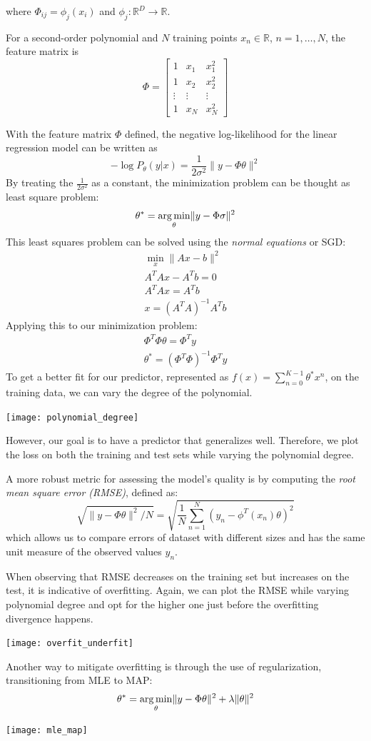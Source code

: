 \documentclass{article}
\begin{document}
where $\Phi_{ij}=\phi_j(x_i)$ and $\phi_j:\mathbb{R}^D\to \mathbb{R}$.
\begin{example}
    For a second-order polynomial and $N$ training points $x_n\in \mathbb{R}$,
    $n=1,\ldots,N$, the feature matrix is
    $$
    \Phi=\begin{bmatrix}
        1 & x_1 & x_1^2 \\ 
        1 & x_2 & x_2^2 \\ 
        \vdots & \vdots & \vdots \\ 
        1 & x_N & x_N^2
    \end{bmatrix}
    $$
\end{example}
With the feature matrix $\Phi$ defined, the negative log-likelihood for the
linear regression model can be written as 
$$-\log P_\theta(y|x)=\frac{1}{2\sigma^2}\lVert y-\Phi\theta\rVert^2$$
By treating the $\frac{1}{2\sigma^2}$ as a constant, the minimization problem
can be thought as least square problem:
$$\theta^*=\operatorname*{arg\,min}_{\theta}\lVert y-\Phi\sigma\rVert^2$$
This least squares problem can be solved using the \textit{normal equations} or SGD:
$$
\begin{aligned}
    \min_x\lVert Ax-b\rVert^2 \\
    A^TAx-A^Tb=0 \\
    A^TAx=A^Tb \\ 
    x=(A^TA)^{-1}A^Tb
\end{aligned}
$$
Applying this to our minimization problem:
$$
\begin{aligned}
    \Phi^T\Phi\theta=\Phi^Ty\\
    \theta^*=(\Phi^T\Phi)^{-1}\Phi^Ty
\end{aligned}
$$
To get a better fit for our predictor, represented as
$f(x)=\sum_{n=0}^{K-1}\theta^*x^n$, on the training data, we can vary the
degree of the polynomial. 
\begin{center}
    \texttt{[image: polynomial\_degree]}
\end{center}
However, our goal is to have a predictor that generalizes well. Therefore, we
plot the loss on both the training and test sets while varying the polynomial
degree.

A more robust metric for assessing the model's quality is by computing the
\textit{root mean square error (RMSE)}, defined as:
$$\sqrt{\lVert
y-\Phi\theta\rVert^2/N}=\sqrt{\frac{1}{N}\sum_{n=1}^{N}(y_n-\phi^T(x_n)\theta)^2}$$
which allows us to compare errors of dataset with different sizes and has the
same unit measure of the observed values $y_n$.

When observing that RMSE decreases on the training set but increases on the
test, it is indicative of overfitting. Again, we can plot the RMSE while
varying polynomial degree and opt for the higher one just before the
overfitting divergence happens.
\begin{center}
    \texttt{[image: overfit\_underfit]}
\end{center}
Another way to mitigate overfitting is through the use of regularization,
transitioning from MLE to MAP:
$$\theta^*=\operatorname*{arg\,min}_\theta \lVert y-\Phi\theta\rVert^2+\lambda \lVert
\theta\rVert^2$$
\begin{center}
    \texttt{[image: mle\_map]}
\end{center}
\end{document}
